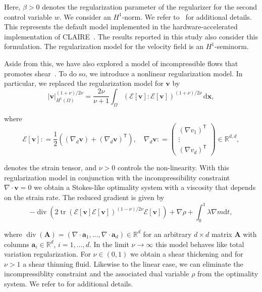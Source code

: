 \documentclass[11pt]{amsart}
\newcommand\igrad{\ensuremath{\nabla}}
\newcommand{\idiv}{\ensuremath{\nabla\cdot}}
\newcommand{\defeq}{\ensuremath{\mathrel{\mathop:}=}}
\renewcommand{\d}{\ensuremath{\text{d}}}
\renewcommand{\vec}[1]{\ensuremath{\boldsymbol{#1}}}
\begin{document}
\noindent Here, $\beta > 0$ denotes the regularization parameter of the regularizer for the second control variable $w$. We consider an $H^1$-norm. We refer to~\cite{Mang:2016a} for additional details. This represents the default model implemented in the hardware-accelerated implementation of CLAIRE~\cite{Mang:2019a,Brunn:2020a,Brunn:2021a}. The results reported in this study also consider this formulation. The regularization model for the velocity field is an $H^1$-seminorm.

Aside from this, we have also explored a model of incompressible flows that promotes shear~\cite{Mang:2016a}. To do so, we introduce a nonlinear regularization model. In particular, we replaced the regularization model for $\vec{v}$ by
\[
|\vec{v}|_{H^1(\Omega)}^{(1+\nu)/2\nu} =
\frac{2 \nu}{\nu + 1}
\int_{\Omega}
\left(
\mathcal{E}[\vec{v}] \colon \mathcal{E}[\vec{v}]
\right)^{(1 + \nu)/2\nu}\, \d \vec{x},
\]

\noindent where
\[
\mathcal{E}[\vec{v}] \defeq \frac{1}{2} \left((\igrad_d \vec{v}) + (\igrad_d \vec{v})^\mathsf{T}\right),
\quad\igrad_d \vec{v} \defeq
\left( \begin{array}{c} (\igrad v_1)^\mathsf{T} \\ \vdots \\(\igrad v_d)^\mathsf{T} \end{array}\right)
\in \mathbb{R}^{d,d},
\]

\noindent denotes the strain tensor, and $\nu > 0$ controls the non-linearity. With this regularization model in conjunction with the incompressibility constraint $\idiv \vec{v} = 0$ we obtain a Stokes-like optimality system with a viscosity that depends on the strain rate. The reduced gradient is given by
\[
- \operatorname{div}\left( 2 \operatorname{tr}(\mathcal{E}[\vec{v}]\mathcal{E}[\vec{v}] )^{(1-\nu)/2\nu} \mathcal{E}[\vec{v}]\right) + \igrad \rho + \int_0^1\lambda \igrad m \d t,
\]

\noindent where $\operatorname{div}( \vec{A} ) = \left(\idiv \vec{a}_1, \ldots, \idiv \vec{a}_d\right) \in \mathbb{R}^d$ for an arbitrary $d \times d$ matrix $\vec{A}$ with columns $\vec{a}_i \in \mathbb{R}^d$, $i = 1, \ldots, d$.  In the limit $\nu \to \infty$ this model behaves like total variation regularization. For $\nu \in (0,1)$ we obtain a shear thickening and for $\nu > 1$ a shear thinning fluid. Likewise to the linear case, we can eliminate the incompressiblity constraint and the associated dual variable $\rho$ from the optimality system. We refer to \cite{Mang:2016a} for additional details.
\end{document}

